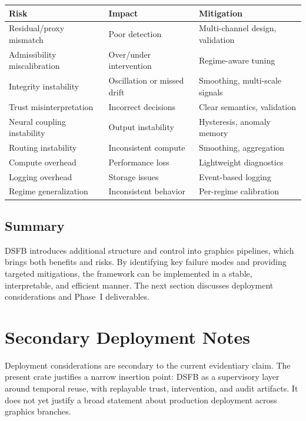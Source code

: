 \documentclass[11pt,letterpaper]{article}
\theoremstyle{gcresult}
\theoremstyle{definition}
\begin{document}
\begin{center}
\begin{tabular}{p{4cm} p{5cm} p{5cm}}
\toprule
Risk & Impact & Mitigation \\
\midrule
Residual/proxy mismatch & Poor detection & Multi-channel design, validation \\
Admissibility miscalibration & Over/under intervention & Regime-aware tuning \\
Integrity instability & Oscillation or missed drift & Smoothing, multi-scale signals \\
Trust misinterpretation & Incorrect decisions & Clear semantics, validation \\
Neural coupling instability & Output instability & Hysteresis, anomaly memory \\
Routing instability & Inconsistent compute & Smoothing, aggregation \\
Compute overhead & Performance loss & Lightweight diagnostics \\
Logging overhead & Storage issues & Event-based logging \\
Regime generalization & Inconsistent behavior & Per-regime calibration \\
\bottomrule
\end{tabular}
\end{center}


\subsection{Summary}

DSFB introduces additional structure and control into graphics pipelines, which brings both benefits and risks. By identifying key failure modes and providing targeted mitigations, the framework can be implemented in a stable, interpretable, and efficient manner. The next section discusses deployment considerations and Phase~I deliverables.


\section{Secondary Deployment Notes}
\label{sec:deployment}

Deployment considerations are secondary to the current evidentiary claim. The present crate justifies a narrow insertion point: DSFB as a supervisory layer around temporal reuse, with replayable trust, intervention, and audit artifacts. It does not yet justify a broad statement about production deployment across graphics branches.
\end{document}
